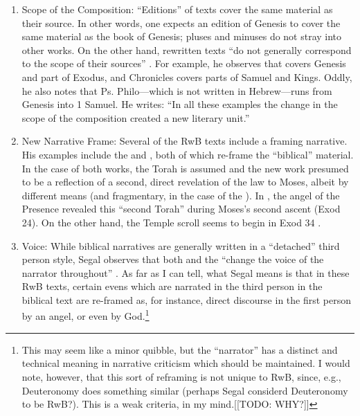 \begin{enumerate}

    \item Scope of the Composition: ``Editions'' of texts cover the same material as their source. In other words, one expects an edition of Genesis to cover the same material as the book of Genesis; pluses and minuses do not stray into other works. On the other hand, rewritten texts ``do not generally correspond to the scope of their sources'' \autocite[20]{segal_henze2005}. For example, he observes that \jub covers Genesis and part of Exodus, and Chronicles covers parts of Samuel and Kings. Oddly, he also notes that Ps. Philo---which is not written in Hebrew---runs from Genesis into 1 Samuel. He writes: ``In all these examples the change in the scope of the composition created a new literary unit.'' \autocite[20--21]{segal_henze2005}
  
    \item New Narrative Frame: Several of the RwB texts include a framing narrative. His examples include the \templescroll and \jub, both of which re-frame the ``biblical'' material. In the case of both works, the Torah is assumed and the new work presumed to be a reflection of a second, direct revelation of the law to Moses, albeit by different means (and fragmentary, in the case of the \templescroll). In \jub, the angel of the Presence revealed this ``second Torah'' during Moses's second ascent (Exod 24). On the other hand, the Temple scroll seems to begin in Exod 34 \autocite[22]{segal_henze2005}.
   
    \item Voice: While biblical narratives are generally written in a ``detached'' third person style, Segal observes that both \jub and the \templescroll ``change the voice of the narrator throughout'' \autocite[22]{segal_henze2005}. As far as I can tell, what Segal means is that in these RwB texts, certain evens which are narrated in the third person in the biblical text are re-framed as, for instance, direct discourse in the first person by an angel, or even by God.\footnote{This may seem like a   minor quibble, but the ``narrator'' has a distinct and technical   meaning in narrative criticism which should be maintained. I would   note, however, that this sort of reframing is not unique to RwB,   since, e.g., Deuteronomy does something similar (perhaps Segal   considerd Deuteronomy to be RwB?). This is a weak criteria, in my   mind.[[TODO: WHY?]]}
 

\end{enumerate}
